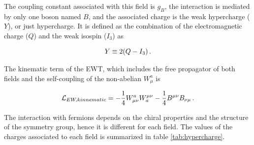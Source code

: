 The coupling constant associated with this field is $g_B$, the interaction is mediated by only one boson named $B$, and the associated charge is the weak hypercharge ($Y$), or just hypercharge. It is defined as the combination of the electromagnetic charge ($Q$) and the weak isospin ($I_3$) as

\begin{equation}
    Y \equiv 2(Q - I_3) \mend
\end{equation}

The kinematic term of the EWT, which includes the free propagator of both fields and the self-coupling of the non-abelian $W_{\mu}^a$ is

\begin{equation}
    \Lagr_{EW,kinnematic} = -\frac{1}{4}W_{\mu\nu}^a W^{\mu\nu}_a - \frac{1}{4} B^{\mu\nu}B_{\nu\mu} \mend
\end{equation}

The interaction with fermions depends on the chiral properties and the structure of the symmetry group, hence it is different for each field. The values of the charges associated to each field is summarized in table \ref{tab:hypercharge}.

\begin{table}[h]
    \centering
    \caption{Values of the electroweak charges (weak isospin $I_3$, hypercharge $Y$ and electromagnetic charge $Q$) for the fermions, according to their type and chirality.}
    \label{tab:hypercharge}
\end{table}

